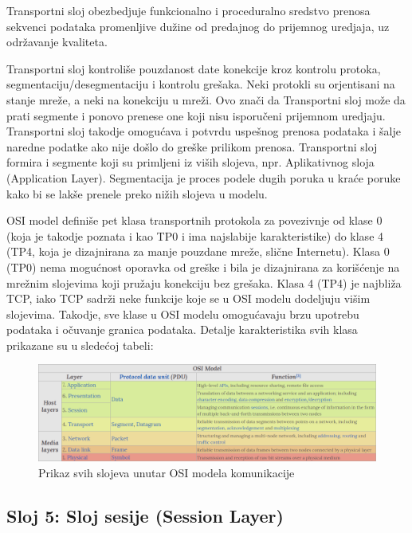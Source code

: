 \documentclass[a4paper,12pt, master]{etf}
\begin{document}
	Transportni sloj obezbedjuje funkcionalno i proceduralno sredstvo prenosa
	sekvenci podataka promenljive du\v{z}ine od predajnog do prijemnog uredjaja,
	 uz odr\v{z}avanje kvaliteta.

	Transportni sloj kontroli\v{s}e pouzdanost date konekcije kroz kontrolu
	protoka, segmentaciju/desegmentaciju i kontrolu gre\v{s}aka. Neki protokli
	su orjentisani na stanje mre\v{z}e, a neki na konekciju u mre\v{z}i.
	Ovo zna\v{c}i da Transportni sloj mo\v{z}e da prati segmente i ponovo
    prenese one koji nisu isporu\v{c}eni prijemnom uredjaju. Transportni sloj
    takodje omogu\'{c}ava i potvrdu uspe\v{s}nog prenosa podataka i \v{s}alje
    naredne podatke ako nije do\v{s}lo do gre\v{s}ke prilikom prenosa.
    Transportni sloj formira i segmente koji su primljeni iz vi\v{s}ih slojeva,
    npr. Aplikativnog sloja (Application Layer). Segmentacija je proces podele
    dugih poruka u kra\'{c}e poruke kako bi se lak\v{s}e prenele preko ni\v{z}ih
    slojeva u modelu.

	OSI model defini\v{s}e pet klasa transportnih protokola za povezivnje od
	klase 0 (koja je takodje poznata i kao TP0 i ima najslabije karakteristike)
	do klase 4 (TP4, koja je dizajnirana za manje pouzdane mre\v{z}e,
	sli\v{c}ne Internetu). Klasa 0 (TP0) nema mogu\'{c}nost	oporavka od
	gre\v{s}ke i bila je dizajnirana za kori\v{s}\'{c}enje na mre\v{z}nim
	slojevima koji pru\v{z}aju konekciju bez gre\v{s}aka. Klasa 4 (TP4) je
	najbli\v{z}a TCP, iako TCP sadr\v{z}i neke funkcije koje se u OSI modelu
	dodeljuju vi\v{s}im slojevima. Takodje, sve klase u OSI modelu
	omogu\'{c}avaju	brzu upotrebu podataka i o\v{c}uvanje granica podataka.
    Detalje karakteristika svih klasa prikazane su u slede\'{c}oj tabeli:

	\begin{figure}[htb]
			\centering
			\includegraphics[scale=.43]{../pic/osi_model.png}
			\caption{Prikaz svih slojeva unutar OSI modela komunikacije}
			\label{fig:osi_model}
	\end{figure}

	\subsection{Sloj 5: Sloj sesije (Session Layer)}
\end{document}
